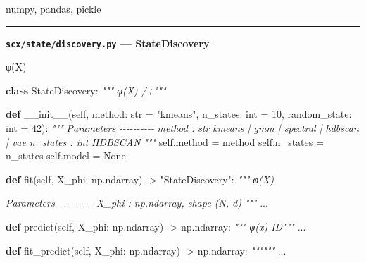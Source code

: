 \documentclass[
  12pt,
]{article}
\newenvironment{Shaded}{}{}
\newcommand{\BuiltInTok}[1]{\textcolor[rgb]{0.00,0.50,0.00}{#1}}
\newcommand{\CommentTok}[1]{\textcolor[rgb]{0.38,0.63,0.69}{\textit{#1}}}
\newcommand{\DecValTok}[1]{\textcolor[rgb]{0.25,0.63,0.44}{#1}}
\newcommand{\FunctionTok}[1]{\textcolor[rgb]{0.02,0.16,0.49}{#1}}
\newcommand{\KeywordTok}[1]{\textcolor[rgb]{0.00,0.44,0.13}{\textbf{#1}}}
\newcommand{\NormalTok}[1]{#1}
\newcommand{\OperatorTok}[1]{\textcolor[rgb]{0.40,0.40,0.40}{#1}}
\newcommand{\StringTok}[1]{\textcolor[rgb]{0.25,0.44,0.63}{#1}}
\newcommand{\VariableTok}[1]{\textcolor[rgb]{0.10,0.09,0.49}{#1}}
\begin{document}
numpy, pandas, pickle

\begin{center}\rule{0.5\linewidth}{0.5pt}\end{center}

\textbf{\texttt{scx/state/discovery.py} --- StateDiscovery}

 φ(X) 

\begin{Shaded}
\begin{Highlighting}[]
\KeywordTok{class}\NormalTok{ StateDiscovery:}
    \CommentTok{""" φ(X) /+"""}

    \KeywordTok{def} \FunctionTok{\_\_init\_\_}\NormalTok{(}\VariableTok{self}\NormalTok{, method: }\BuiltInTok{str} \OperatorTok{=} \StringTok{"kmeans"}\NormalTok{, n\_states: }\BuiltInTok{int} \OperatorTok{=} \DecValTok{10}\NormalTok{,}
\NormalTok{                 random\_state: }\BuiltInTok{int} \OperatorTok{=} \DecValTok{42}\NormalTok{):}
        \CommentTok{"""}
\CommentTok{        Parameters}
\CommentTok{        {-}{-}{-}{-}{-}{-}{-}{-}{-}{-}}
\CommentTok{        method : str}
\CommentTok{             \textquotesingle{}kmeans\textquotesingle{} | \textquotesingle{}gmm\textquotesingle{} | \textquotesingle{}spectral\textquotesingle{} | \textquotesingle{}hdbscan\textquotesingle{} | \textquotesingle{}vae\textquotesingle{}}
\CommentTok{        n\_states : int}
\CommentTok{            HDBSCAN }
\CommentTok{        """}
        \VariableTok{self}\NormalTok{.method }\OperatorTok{=}\NormalTok{ method}
        \VariableTok{self}\NormalTok{.n\_states }\OperatorTok{=}\NormalTok{ n\_states}
        \VariableTok{self}\NormalTok{.model }\OperatorTok{=} \VariableTok{None}

    \KeywordTok{def}\NormalTok{ fit(}\VariableTok{self}\NormalTok{, X\_phi: np.ndarray) }\OperatorTok{{-}\textgreater{}} \StringTok{"StateDiscovery"}\NormalTok{:}
        \CommentTok{""" φ(X) }

\CommentTok{        Parameters}
\CommentTok{        {-}{-}{-}{-}{-}{-}{-}{-}{-}{-}}
\CommentTok{        X\_phi : np.ndarray, shape (N, d)}
\CommentTok{            }
\CommentTok{        """}
\NormalTok{        ...}

    \KeywordTok{def}\NormalTok{ predict(}\VariableTok{self}\NormalTok{, X\_phi: np.ndarray) }\OperatorTok{{-}\textgreater{}}\NormalTok{ np.ndarray:}
        \CommentTok{""" φ(x)  ID"""}
\NormalTok{        ...}

    \KeywordTok{def}\NormalTok{ fit\_predict(}\VariableTok{self}\NormalTok{, X\_phi: np.ndarray) }\OperatorTok{{-}\textgreater{}}\NormalTok{ np.ndarray:}
        \CommentTok{""""""}
\NormalTok{        ...}


\end{Highlighting}
\end{Shaded}
\end{document}
